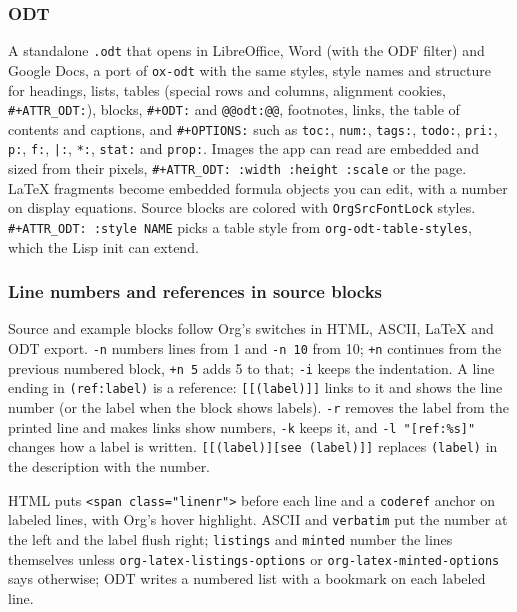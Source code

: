 \documentclass[11pt]{article}
\begin{document}
\subsubsection{ODT}
\label{sec:orga9c86a3}

A standalone \texttt{.odt} that opens in LibreOffice, Word (with the ODF filter) and Google Docs, a port of \texttt{ox-odt} with the same styles, style names and structure for headings, lists, tables (special rows and columns, alignment cookies, \texttt{\#+ATTR\_ODT:}), blocks, \texttt{\#+ODT:} and \texttt{@@odt:@@}, footnotes, links, the table of contents and captions, and \texttt{\#+OPTIONS:} such as \texttt{toc:}, \texttt{num:}, \texttt{tags:}, \texttt{todo:}, \texttt{pri:}, \texttt{p:}, \texttt{f:}, \texttt{|:}, \texttt{*:}, \texttt{stat:} and \texttt{prop:}. Images the app can read are embedded and sized from their pixels, \texttt{\#+ATTR\_ODT: :width :height :scale} or the page. \LaTeX{} fragments become embedded formula objects you can edit, with a number on display equations. Source blocks are colored with \texttt{OrgSrcFontLock} styles. \texttt{\#+ATTR\_ODT: :style NAME} picks a table style from \texttt{org-odt-table-styles}, which the Lisp init can extend.

\subsubsection{Line numbers and references in source blocks}
\label{sec:org14cbc7b}
Source and example blocks follow Org's switches in HTML, ASCII, \LaTeX{} and ODT export. \texttt{-n} numbers lines from 1 and \texttt{-n 10} from 10; \texttt{+n} continues from the previous numbered block, \texttt{+n 5} adds 5 to that; \texttt{-i} keeps the indentation. A line ending in \texttt{(ref:label)} is a reference: \texttt{[[(label)]]} links to it and shows the line number (or the label when the block shows labels). \texttt{-r} removes the label from the printed line and makes links show numbers, \texttt{-k} keeps it, and \texttt{-l "[ref:\%s]"} changes how a label is written. \texttt{[[(label)][see (label)]]} replaces \texttt{(label)} in the description with the number.

HTML puts \texttt{<span class="linenr">} before each line and a \texttt{coderef} anchor on labeled lines, with Org's hover highlight. ASCII and \texttt{verbatim} put the number at the left and the label flush right; \texttt{listings} and \texttt{minted} number the lines themselves unless \texttt{org-latex-listings-options} or \texttt{org-latex-minted-options} says otherwise; ODT writes a numbered list with a bookmark on each labeled line.
\end{document}
